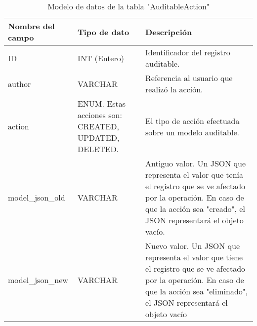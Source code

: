 \begin{table}[h]
\centering
\caption{Modelo de datos de la tabla "AuditableAction"}
\label{tabla:1.3}
\begin{tabular}{| p{} | p{} | p{} |}
\hline
\textbf{Nombre del campo} & \textbf{Tipo de dato}                               & \textbf{Descripción}                                                                                                                                                                   \\ \hline
ID                        & INT (Entero)                                        & Identificador del registro auditable.                                                                                                                                                  \\ \hline
author                    & VARCHAR                                             & Referencia al usuario que realizó la acción.                                                                                                                                           \\ \hline
action                    & ENUM. Estas acciones son: CREATED, UPDATED, DELETED. & El tipo de acción efectuada sobre un modelo auditable.                                                                                                                                 \\ \hline
model\_json\_old          & VARCHAR                                             & Antiguo valor. Un JSON que representa el valor que tenía el registro que se ve afectado por la operación. En caso de que la acción sea "creado", el JSON representará el objeto vacío. \\ \hline
model\_json\_new          & VARCHAR                                             & Nuevo valor. Un JSON que representa el valor que tiene el registro que se ve afectado por la operación. En caso de que la acción sea "eliminado", el JSON representará el objeto vacío \\ \hline
\end{tabular}

\end{table}

